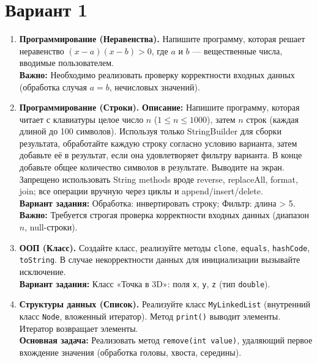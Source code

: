 \documentclass[10pt,a4paper]{article}
\begin{document}
\section*{Вариант 1}

\begin{enumerate}
    \item \textbf{Программирование (Неравенства).} Напишите программу, которая решает неравенство $(x - a)(x - b) > 0$, где $a$ и $b$ — вещественные числа, вводимые пользователем. \\
    \textbf{Важно:} Необходимо реализовать проверку корректности входных данных (обработка случая $a = b$, нечисловых значений).
    
    \item \textbf{Программирование (Строки).} \textbf{Описание:} Напишите программу, которая читает с клавиатуры целое число $n$ ($1 \leq n \leq 1000$), затем $n$ строк (каждая длиной до 100 символов). Используя только StringBuilder для сборки результата, обработайте каждую строку согласно условию варианта, затем добавьте её в результат, если она удовлетворяет фильтру варианта. В конце добавьте общее количество символов в результате. Выводите на экран. Запрещено использовать String methods вроде reverse, replaceAll, format, join; все операции вручную через циклы и append/insert/delete. \\
    \textbf{Вариант задания:} Обработка: инвертировать строку; Фильтр: длина > 5. \\
    \textbf{Важно:} Требуется строгая проверка корректности входных данных (диапазон $n$, null-строки).
    
    \item \textbf{ООП (Класс).} Создайте класс, реализуйте методы \texttt{clone}, \texttt{equals}, \texttt{hashCode}, \texttt{toString}. В случае некорректности данных для инициализации вызывайте исключение. \\
    \textbf{Вариант задания:} Класс «Точка в 3D»: поля \texttt{x}, \texttt{y}, \texttt{z} (тип \texttt{double}).
    
    \item \textbf{Структуры данных (Список).} Реализуйте класс \texttt{MyLinkedList} (внутренний класс \texttt{Node}, вложенный итератор). Метод \texttt{print()} выводит элементы. Итератор возвращает элементы. \\
    \textbf{Основная задача:} Реализовать метод \texttt{remove(int value)}, удаляющий первое вхождение значения (обработка головы, хвоста, середины).
\end{enumerate}
\end{document}
